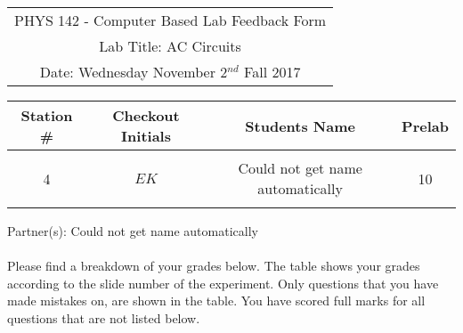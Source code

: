 \documentclass{article}
\begin{document}

\begin{table}[h]
	\centering
	\begin{tabular}{c}
	PHYS 142 - Computer Based Lab Feedback Form\\
	Lab Title: AC Circuits\\Date: Wednesday November 2$^{nd}$ Fall 2017 \\\hline
\end{tabular}
\end{table}
\begin{table}[h]\centering \begin{tabular}{|c|c|p{9.9 cm}|c|}\hline Station \#  & Checkout Initials & \multicolumn{1}{|c|}{Students Name} & Prelab \\\hline\multirow{3}{*}{4}& \multirow{3}{*}{$EK$} & &\\& &\multicolumn{1}{|c|}{Could not get name automatically}&10\\&   &  &\\\hline
\end{tabular}
\end{table}
Partner(s): Could not get name automatically\\
\\Please find a breakdown of your grades below. The table shows your grades according to the slide number of the experiment. Only questions that you have made mistakes on, are shown in the table. You have scored full marks for all questions that are not listed below.
\end{document}
